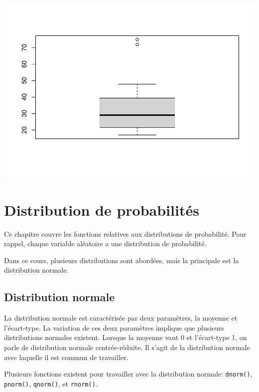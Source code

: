 \documentclass[
]{book}
\newenvironment{Shaded}{\begin{snugshade}}{\end{snugshade}}
\newcommand{\FunctionTok}[1]{\textcolor[rgb]{0.13,0.29,0.53}{\textbf{#1}}}
\newcommand{\NormalTok}[1]{#1}
\newcommand{\SpecialCharTok}[1]{\textcolor[rgb]{0.81,0.36,0.00}{\textbf{#1}}}
\begin{document}
\begin{Shaded}
\end{Shaded}

\includegraphics{_main_files/figure-latex/unnamed-chunk-54-2.pdf}

\chapter{Distribution de probabilités}\label{distribution-de-probabilituxe9s}

Ce chapitre couvre les fonctions relatives aux distributions de probabilité. Pour rappel, chaque variable aléatoire a une distribution de probabilité.

Dans ce cours, plusieurs distributions sont abordées, mais la principale est la distribution normale.

\section{Distribution normale}\label{distribution-normale}

La distribution normale est caractérisée par deux paramètres, la moyenne et l'écart-type. La variation de ces deux paramètres implique que plusieurs distributions normales existent. Lorsque la moyenne vaut 0 et l'écart-type 1, on parle de distribution normale centrée-réduite. Il s'agit de la distribution normale avec laquelle il est commun de travailler.

Plusieurs fonctions existent pour travailler avec la distribution normale: \texttt{dnorm()}, \texttt{pnorm()}, \texttt{qnorm()}, et \texttt{rnorm()}.
\end{document}
